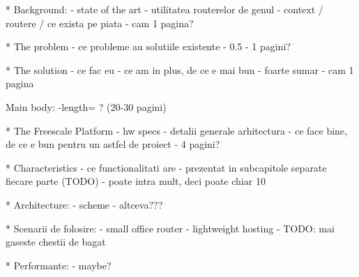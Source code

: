 * Background:
        - state of the art
        - utilitatea routerelor de genul
        - context / routere / ce exista pe piata
        - cam 1 pagina?
        
    * The problem
        - ce probleme au solutiile existente
        - 0.5 - 1 pagini?
        
    * The solution
        - ce fac eu
        - ce am in plus, de ce e mai bun
        - foarte sumar
        - cam 1 pagina


Main body:
    -length= ? (20-30 pagini)

* The Freescale Platform
        - hw specs
        - detalii generale arhitectura
- ce face bine, de ce e bun pentru un astfel de proiect
- 4 pagini?        

    * Characteristics
        - ce functionalitati are
        - prezentat in subcapitole separate fiecare parte
        (TODO)
        - poate intra mult, deci poate chiar 10

    * Architecture:
        - scheme
        - altceva???


    
* Scenarii de folosire:
        - small office router    
        - lightweight hosting
        - TODO: mai gaseste chestii de bagat
    
    * Performante:
        - maybe?
